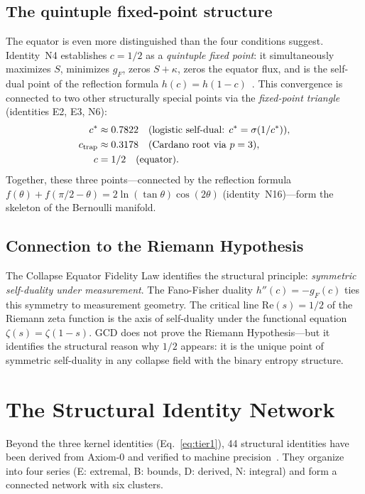 \documentclass[
  aps,
  prd,
  twocolumn,
  superscriptaddress,
  nofootinbib,
  floatfix
]{revtex4-2}
\newcommand{\gF}{g_{\!F}}
\begin{document}
\subsection{The quintuple fixed-point structure}

The equator is even more distinguished than the four conditions
suggest.  Identity~N4 establishes $c = 1/2$ as a \emph{quintuple
fixed point}: it simultaneously maximizes $S$, minimizes $\gF$,
zeros $S + \kappa$, zeros the equator flux, and is the self-dual
point of the reflection formula $h(c) = h(1 - c)$~\cite{umcpmetadatarepo}.
This convergence is connected to two other structurally special
points via the \emph{fixed-point triangle} (identities E2, E3, N6):
\begin{align}
  c^* &\approx 0.7822 \quad\text{(logistic self-dual: $c^* = \sigma(1/c^*)$)}, \notag\\
  c_{\mathrm{trap}} &\approx 0.3178 \quad\text{(Cardano root via $p = 3$)}, \\
  c &= 1/2 \quad\text{(equator)}. \notag
\end{align}
Together, these three points---connected by the reflection formula
$f(\theta) + f(\pi/2 - \theta) = 2\ln(\tan\theta)\cos(2\theta)$
(identity~N16)---form the skeleton of the Bernoulli manifold.

\subsection{Connection to the Riemann Hypothesis}

The Collapse Equator Fidelity Law identifies the structural
principle: \emph{symmetric self-duality under measurement}.
The Fano-Fisher duality $h''(c) = -\gF(c)$ ties this symmetry to
measurement geometry.  The critical line $\mathrm{Re}(s) = 1/2$ of
the Riemann zeta function is the axis of self-duality under the
functional equation $\zeta(s) = \zeta(1 - s)$.  GCD does not prove
the Riemann Hypothesis---but it identifies the structural reason
why $1/2$ appears: it is the unique point of symmetric self-duality
in any collapse field with the binary entropy structure.

\section{The Structural Identity Network}\label{sec:identities}

Beyond the three kernel identities (Eq.~\ref{eq:tier1}), 44 structural identities have been derived from Axiom-0 and verified
to machine precision~\cite{umcpmetadatarepo}.  They organize into
four series (E: extremal, B: bounds, D: derived, N: integral) and
form a connected network with six clusters.
\end{document}
